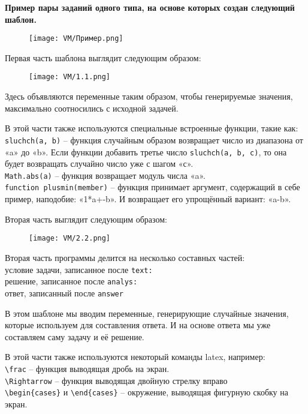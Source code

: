 \textbf{Пример пары заданий одного типа, на основе которых создан следующий шаблон. } 

\begin{figure}[h]
		\centering
		\texttt{[image: VM/Пример.png]}
\label{ris:image}
\end{figure}

Первая часть шаблона выглядит следующим образом:

	\begin{figure}[h]
		\centering
		\texttt{[image: VM/1.1.png]}
	\end{figure}

Здесь объявляются переменные таким образом, чтобы генерируемые значения,  максимально соотносились с исходной задачей.

В этой части также используются специальные встроенные функции, такие как:
\\ \texttt{sluchch(a, b)} – функция случайным образом возвращает число из диапазона от «a» до «b». Если функции добавить третье число \texttt{sluchch(a, b, с)}, то она будет возвращать случайно число уже с шагом «с».
\\ \texttt{Math.abs(a)} – функция возвращает модуль числа «a».
\\ \texttt{function plusmin(member)} – функция принимает аргумент, содержащий в себе пример, наподобие: «1*a+-b». И возвращает его упрощённый вариант: «a-b».

Вторая часть выглядит следующим образом:

	\begin{figure}[h]
		\centering
		\texttt{[image: VM/2.2.png]}
	\end{figure}

Вторая часть программы делится на несколько составных частей:
\\ условие задачи, записанное после \texttt{text:}
\\ решение, записанное после \texttt{analys:}
\\ ответ, записанный после \texttt{answer}

В этом шаблоне мы вводим переменные, генерирующие случайные значения, которые используем для составления ответа. И на основе ответа мы уже составляем саму задачу и её решение.

В этой части также используются некоторый команды latex, например:
\\ \texttt{\textbackslash frac} – функция выводящая дробь на экран.
\\ \texttt{\textbackslash Rightarrow} – функция выводящая двойную стрелку вправо
\\ \texttt{\textbackslash begin\{cases\}} и \texttt{\textbackslash end\{cases\}} – окружение, выводящая фигурную скобку на экран.

